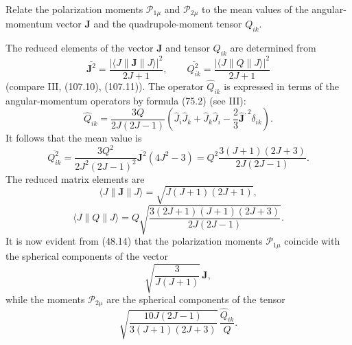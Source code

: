 \ProblemHeading
Relate the polarization moments $\mathcal P_{1\mu}$ and $\mathcal P_{2\mu}$ to the mean values of the angular-momentum vector $\mathbf J$ and the quadrupole-moment tensor $Q_{ik}$.

\SolutionHeading The reduced elements of the vector $\mathbf J$ and tensor $Q_{ik}$ are determined from
\[
\overline{\mathbf J^2}=\frac{|\langle J\|\mathbf J\|J\rangle|^2}{2J+1},
\qquad
\overline{Q_{ik}^2}=\frac{|\langle J\|Q\|J\rangle|^2}{2J+1}
\]
(compare III, (107.10), (107.11)). The operator $\widehat Q_{ik}$ is expressed in terms of the angular-momentum operators by formula (75.2) (see III):
\[
\widehat Q_{ik}=\frac{3Q}{2J(2J-1)}
\left(\widehat J_i\widehat J_k+\widehat J_k\widehat J_i
-\frac23\widehat{\mathbf J}^{,2}\delta_{ik}\right).
\]
It follows that the mean value is
\[
\overline{Q_{ik}^2}
=\frac{3Q^2}{2J^2(2J-1)^2}\overline{\mathbf J^2}(4J^2-3)
=Q^2\frac{3(J+1)(2J+3)}{2J(2J-1)}.
\]
The reduced matrix elements are
\[
\langle J\|\mathbf J\|J\rangle=\sqrt{J(J+1)(2J+1)},
\]
\[
\langle J\|Q\|J\rangle
=Q\sqrt{\frac{3(2J+1)(J+1)(2J+3)}{2J(2J-1)}}.
\]
It is now evident from (48.14) that the polarization moments $\mathcal P_{1\mu}$ coincide with the spherical components of the vector
\[
\sqrt{\frac3{J(J+1)}}\,\mathbf J,
\]
while the moments $\mathcal P_{2\mu}$ are the spherical components of the tensor
\[
\sqrt{\frac{10J(2J-1)}{3(J+1)(2J+3)}}\,\frac{\widehat Q_{ik}}Q.
\]
